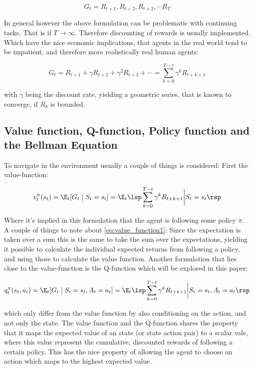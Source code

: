 \begin{equation}\label{eq:cum_rewards}
   G_t = R_{t+1}, R_{t+2}, R_{t+3}, \cdots R_{T}
\end{equation}

In general however the above formulation can be problematic with continuing tasks. That is if $T \rightarrow \infty$. Therefore discounting of rewards is usually implemented. Which have the nice economic implications, that agents in the real world tend to be impatient, and therefore more realistically real human agents:

\begin{equation}
    G_t = R_{t+1} + \gamma R_{t+2} + \gamma^2 R_{t+3} + \cdots = \sum_{k=0}^{T - t} \gamma^k R_{t+k+1}
\end{equation}

with $\gamma$ being the discount rate, yielding a geometric series, that is known to converge, if $R_k$ is bounded.

\subsection{Value function, Q-function, Policy function and the Bellman Equation}

To navigate in the environment usually a couple of things is considered: First the value-function:

\begin{equation}\label{eq:value_function1}
    v_{t}^{\pi}(s_t) = \E_t [G_t \mid S_t = s_t] = \E_t \lsp \sum_{k=0}^{T - t} \gamma^k R_{t+k+1} \bigg\vert S_t = s_t \rsp 
\end{equation}

Where it's implied in this formulation that the agent is following some policy $\pi$. A couple of things to note about \eqref{eq:value_function1}: Since the expectation is taken over a sum this is the same to take the sum over the expectations, yielding it possible to calculate the individual expected returns from following a policy, and using those to calculate the value function. Another formulation that lies close to the value-function is the Q-function which will be explored in this paper:

\begin{equation}
    q_t^{\pi} (s_t, a_t) = \E_t [G_t \mid S_t = s_t, A_t = a_t ] = \E_t \lsp \sum_{k=0}^{T - t} \gamma^k R_{t+k+1} \bigg\vert S_t = s_t, A_t = a_t\rsp 
\end{equation}

which only differ from the value function by also conditioning on the action, and not only the state. The value function and the Q-function shares the property that it maps the expected value of an state (or state action pair) to a scalar vale, where this value represent the cumulative, discounted rewards of following a certain policy. This has the nice property of allowing the agent to choose an action which maps to the highest expected value.

